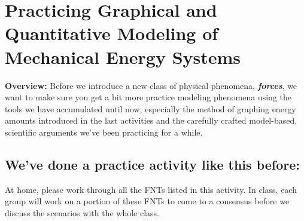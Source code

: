 \section[More Modeling of Mechanical Energy Systems]{Practicing Graphical and Quantitative Modeling of Mechanical Energy Systems}
\label{act2.3.2}

\begin{overview}

\textbf{Overview:} Before we introduce a new class of physical phenomena, \textbf{\emph{forces}}, we want to make sure you get a bit more practice modeling phenomena using the tools we have accumulated until now, especially the method of graphing energy amounts introduced in the last activities and the carefully crafted model-based, scientific arguments we've been practicing for a while.
	
\end{overview}

\subsection*{We've done a practice activity like this before:}

At home, please work through all the FNTs listed in this activity. In class, each group will work on a portion of these FNTs to come to a consensus before we discuss the scenarios with the whole class.\\

\begin{fnt}
	
\end{fnt}

\begin{fnt}
	
\end{fnt}

\begin{fnt}
	
\end{fnt}

\begin{fnt}
	
\end{fnt}

\begin{fnt}
	
\end{fnt}

\begin{fnt}
	
\end{fnt}

